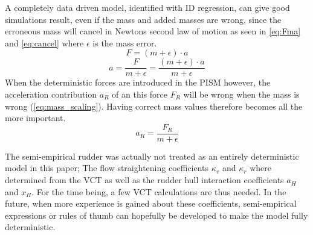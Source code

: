 A completely data driven model, identified with ID regression, can give good simulations result, even if the mass and added masses are wrong, since the erroneous mass will cancel in Newtons second law of motion as seen in \autoref{eq:Fma} and \autoref{eq:cancel} where $\epsilon$ is the mass error.
\begin{equation}
    \label{eq:Fma}
    F = (m+\epsilon) \cdot a
\end{equation}
\begin{equation}
    \label{eq:cancel}
    a = \frac{F}{m+\epsilon} = \frac{(m+\epsilon) \cdot a}{m+\epsilon}
\end{equation}
When the deterministic forces are introduced in the PISM however, the acceleration contribution $a_R$ of an this force $F_R$ will be wrong when the mass is wrong (\autoref{eq:mass_scaling}). Having correct mass values therefore becomes all the more important.
\begin{equation}
    \label{eq:mass_scaling}
    a_R = \frac{F_R}{m+\epsilon}
\end{equation}

The semi-empirical rudder was actually not treated as an entirely deterministic model in this paper; The flow straightening coefficients $\kappa_v$ and $\kappa_r$ where determined from the VCT as well as the rudder hull interaction coefficients $a_H$ and $x_H$. For the time being, a few VCT calculations are thus needed. In the future, when more experience is gained about these coefficients, semi-empirical expressions or rules of thumb can hopefully be developed to make the model fully deterministic. 